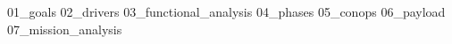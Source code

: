 {01_goals}
{02_drivers}
{03_functional_analysis}
{04_phases}
{05_conops}
{06_payload}
{07_mission_analysis}